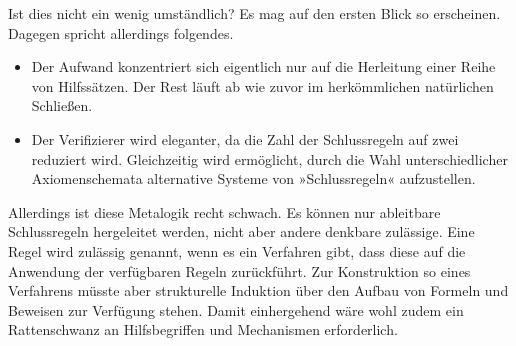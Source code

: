 \documentclass[9pt,fleqn,aspectratio=169]{beamer}
\begin{document}
\begin{frame}
Ist dies nicht ein wenig umständlich?\pause{} Es mag auf den ersten
Blick so erscheinen. Dagegen spricht allerdings folgendes.
\begin{itemize}
\item Der Aufwand konzentriert sich eigentlich nur auf die Herleitung
  einer Reihe von Hilfssätzen. Der Rest läuft ab wie zuvor im
  herkömmlichen natürlichen Schließen.
\item Der Verifizierer wird eleganter, da die Zahl der Schlussregeln
  auf zwei reduziert wird. Gleichzeitig wird ermöglicht, durch die
  Wahl unterschiedlicher Axiomenschemata alternative Systeme von
  »Schlussregeln« aufzustellen.
\end{itemize}\pause
Allerdings ist diese Metalogik recht schwach. Es können nur ableitbare
Schlussregeln hergeleitet werden, nicht aber andere denkbare zulässige.
Eine Regel wird zulässig genannt, wenn es ein Verfahren gibt, dass
diese auf die Anwendung der verfügbaren Regeln zurückführt. Zur Konstruktion
so eines Verfahrens müsste aber strukturelle Induktion über den Aufbau von
Formeln und Beweisen zur Verfügung stehen. Damit einhergehend wäre wohl
zudem ein Rattenschwanz an Hilfsbegriffen und Mechanismen erforderlich.
\end{frame}
\end{document}
